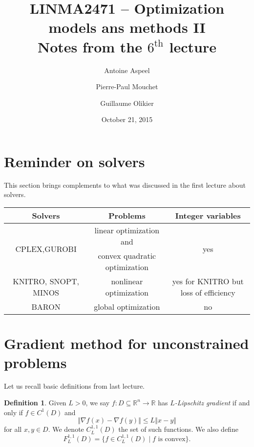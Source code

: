 \documentclass{article}
\title{LINMA2471 -- Optimization models ans methods II \\ Notes from the $6^\mathrm{th}$ lecture}
\author{Antoine Aspeel \and Pierre-Paul Mouchet \and Guillaume Olikier}
\date{October 21, 2015}
\theoremstyle{definition}
\newtheorem{defi}{Definition}
\newcommand{\vnorm}[1]{\left\Vert #1 \right\Vert}
\begin{document}
\maketitle



\section{Reminder on solvers}

This section brings complements to what was discussed in the first lecture about solvers.


\begin{tabular}{|c|c|c|}
\hline
Solvers & Problems & Integer variables \\
\hline
\multirow{2}{*}{CPLEX,GUROBI} & linear optimization and & \multirow{2}{*}{yes} \\
 & convex quadratic optimization &  \\[0.1cm]
KNITRO, SNOPT, MINOS & nonlinear optimization & yes for KNITRO but loss of efficiency \\[0.1cm]
BARON & global optimization & no \\
\hline
\end{tabular}

\section{Gradient method for unconstrained problems}

Let us recall basic definitions from last lecture.
\begin{defi}
Given $L>0$, we say $f : D \subseteq \mathbb{R}^n \to \mathbb{R}$ has \emph{$L$-Lipschitz gradient} if and only if $f \in C^1(D)$ and
\begin{equation*}
\vnorm{\nabla f(x) - \nabla f(y)} \le L \vnorm{x-y}
\end{equation*}
for all $x,y \in D$. We denote $C_L^{1,1}(D)$ the set of such functions. We also define
\begin{equation*}
F_L^{1,1}(D) = \{ f \in C_L^{1,1}(D) \mid f \text{ is convex}\} .
\end{equation*}
\end{defi}
\end{document}
